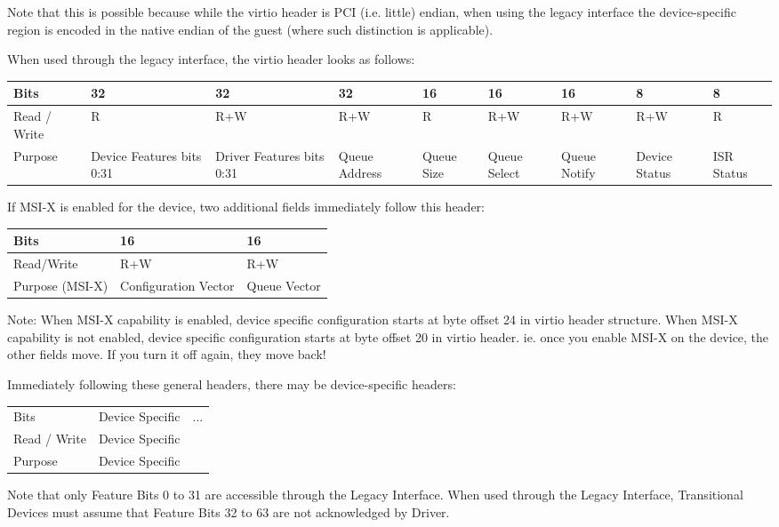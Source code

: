 Note that this is possible because while the virtio header is PCI
(i.e. little) endian, when using the legacy interface the device-specific
region is encoded in the native endian of the guest (where such distinction is
applicable).

When used through the legacy interface, the virtio header looks as follows:

\begin{tabularx}{\textwidth}{ |X||X|X|X|X|X|X|X|X| }
\hline
 Bits & 32 & 32 & 32 & 16 & 16 & 16 & 8 & 8 \\
\hline
 Read / Write & R & R+W & R+W & R & R+W & R+W & R+W & R \\
\hline
 Purpose & Device Features bits 0:31 & Driver Features bits 0:31 &
  Queue Address & Queue Size & Queue Select & Queue Notify &
  Device Status & ISR \newline Status \\
\hline
\end{tabularx}

If MSI-X is enabled for the device, two additional fields
immediately follow this header:

\begin{tabular}{ |l||l|l| }
\hline
Bits       & 16             & 16     \\
\hline
Read/Write & R+W            & R+W    \\
\hline
Purpose (MSI-X) & Configuration Vector  & Queue Vector \\
\hline
\end{tabular}

Note: When MSI-X capability is enabled, device specific configuration starts at
byte offset 24 in virtio header structure. When MSI-X capability is not
enabled, device specific configuration starts at byte offset 20 in virtio
header.  ie. once you enable MSI-X on the device, the other fields move.
If you turn it off again, they move back!

Immediately following these general headers, there may be
device-specific headers:

\begin{tabular}{|l||l|l|}
\hline
Bits & Device Specific & \multirow{3}{*}{...} \\
\cline{1-2}
Read / Write & Device Specific & \\
\cline{1-2}
Purpose & Device Specific & \\
\hline
\end{tabular}

Note that only Feature Bits 0 to 31 are accessible through the
Legacy Interface. When used through the Legacy Interface,
Transitional Devices must assume that Feature Bits 32 to 63
are not acknowledged by Driver.

